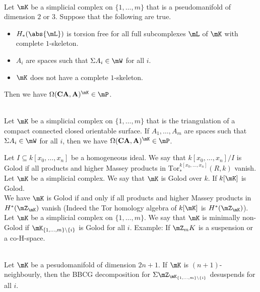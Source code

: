 \documentclass[a4paper]{article}
\begin{document}
\begin{thm}{}{}\\
Let $\mK$ be a simplicial complex on $\{1,\dots,m\}$ that is a pseudomanifold of dimension $2$ or $3$. Suppose that the following are true. 
\begin{itemize}
\item $H_\ast(\abs{\mL})$ is torsion free for all full subcomplexes $\mL$ of $\mK$ with complete $1$-skeleton. 
\item $A_i$ are spaces such that $\Sigma A_i\in\mW$ for all $i$. 
\item $\mK$ does not have a complete $1$-skeleton. 
\end{itemize}
Then we have $\Omega(\bold{CA},\bold{A})^\mK\in\mP$. 
\end{thm}

\begin{crl}{}{}\\
Let $\mK$ be a simplicial complex on $\{1,\dots,m\}$ that is the triangulation of a compact connected closed orientable surface. If $A_1,\dots,A_m$ are spaces such that $\Sigma A_i\in\mW$ for all $i$, then we have $\Omega(\bold{CA},\bold{A})^\mK\in\mP$. 
\end{crl}

Let $I\subseteq k[x_0,\dots,x_n]$ be a homogeneous ideal. We say that $k[x_0,\dots,x_n]/I$ is Golod if all products and higher Massey products in $\text{Tor}_\ast^{k[x_0,\dots,x_n]}(R,k)$ vanish. \\

Let $\mK$ be a simplicial complex. We say that $\mK$ is Golod over $k$. If $k[\mK]$ is Golod. \\

We have $\mK$ is Golod if and only if all products and higher Massey products in $H^\ast(\mZ_\mK)$ vanish (Indeed the Tor homology algebra of $k[\mK]$ is $H^\ast(\mZ_\mK)$). \\

Let $\mK$ be a simplicial complex on $\{1,\dots,m\}$. We say that $\mK$ is minimally non-Golod if $\mK_{\{1,\dots,m\}\setminus\{i\}}$ is Golod for all $i$. Example: If $\mZ_mK$ is a suspension or a co-H-space. 

\begin{prp}{}{}\\
Let $\mK$ be a pesudomanifold of dimension $2n+1$. If $\mK$ is $(n+1)$-neighbourly, then the BBCG decomposition for $\Sigma\mZ_{\mK_{\{1,\dots,m\}\setminus\{i\}}}$ desuspends for all $i$. 
\end{prp}
\end{document}
